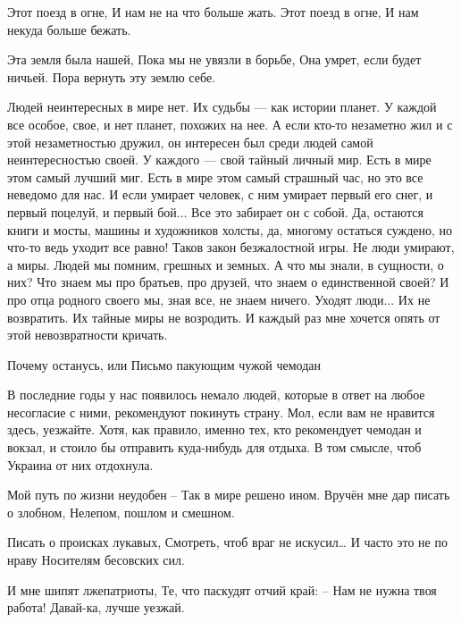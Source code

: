  
 
 
 
 

Этот поезд в огне,
И нам не на что больше жать.
Этот поезд в огне,
И нам некуда больше бежать.

Эта земля была нашей,
Пока мы не увязли в борьбе,
Она умрет, если будет ничьей.
Пора вернуть эту землю себе.


Людей неинтересных в мире нет.
Их судьбы — как истории планет.
У каждой все особое, свое,
и нет планет, похожих на нее.
А если кто-то незаметно жил
и с этой незаметностью дружил,
он интересен был среди людей
самой неинтересностью своей.
У каждого — свой тайный личный мир.
Есть в мире этом самый лучший миг.
Есть в мире этом самый страшный час,
но это все неведомо для нас.
И если умирает человек,
с ним умирает первый его снег,
и первый поцелуй, и первый бой...
Все это забирает он с собой.
Да, остаются книги и мосты,
машины и художников холсты,
да, многому остаться суждено,
но что-то ведь уходит все равно!
Таков закон безжалостной игры.
Не люди умирают, а миры.
Людей мы помним, грешных и земных.
А что мы знали, в сущности, о них?
Что знаем мы про братьев, про друзей,
что знаем о единственной своей?
И про отца родного своего
мы, зная все, не знаем ничего.
Уходят люди... Их не возвратить.
Их тайные миры не возродить.
И каждый раз мне хочется опять
от этой невозвратности кричать.


Почему останусь, или Письмо пакующим чужой чемодан

В последние годы у нас появилось немало людей, которые в ответ на любое несогласие с ними, рекомендуют покинуть страну. Мол, если вам не нравится здесь, уезжайте. Хотя, как правило, именно тех, кто рекомендует чемодан и вокзал, и стоило бы отправить куда-нибудь для отдыха. В том смысле, чтоб Украина от них отдохнула.


Мой путь по жизни неудобен – 
Так в мире решено ином.
Вручён мне дар писать о злобном,
Нелепом, пошлом и смешном.

Писать о происках лукавых,
Смотреть, чтоб враг не искусил…
И часто это не по нраву
Носителям бесовских сил.

И мне шипят лжепатриоты,
Те, что паскудят отчий край:
– Нам не нужна твоя работа!
Давай-ка, лучше уезжай.

